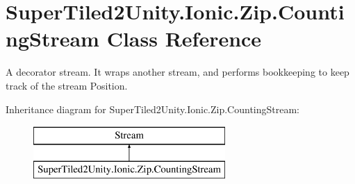 \hypertarget{class_super_tiled2_unity_1_1_ionic_1_1_zip_1_1_counting_stream}{}\section{Super\+Tiled2\+Unity.\+Ionic.\+Zip.\+Counting\+Stream Class Reference}
\label{class_super_tiled2_unity_1_1_ionic_1_1_zip_1_1_counting_stream}


A decorator stream. It wraps another stream, and performs bookkeeping to keep track of the stream Position.  


Inheritance diagram for Super\+Tiled2\+Unity.\+Ionic.\+Zip.\+Counting\+Stream\+:\begin{figure}[H]
\begin{center}
\leavevmode
\includegraphics[height=2.000000cm]{class_super_tiled2_unity_1_1_ionic_1_1_zip_1_1_counting_stream}
\end{center}
\end{figure}
